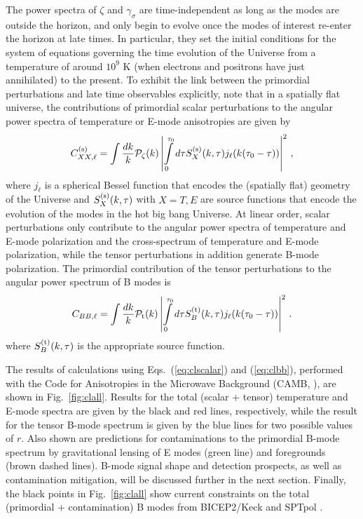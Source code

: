 The power spectra of $\zeta$ and $\gamma_\sigma$ are time-independent as long as the modes are outside the horizon, and only begin to evolve once the modes of interest re-enter the horizon at late times. In particular, they set the initial conditions for the system of equations governing the time evolution of the Universe from a temperature of around $10^9$ K (when electrons and positrons have just annihilated) to the present. To exhibit the link between the primordial perturbations and late time observables explicitly, note that in a spatially flat universe, the contributions of primordial scalar perturbations to the angular power spectra of temperature or E-mode anisotropies are given by
\begin{equation}
C^{({\rm s})}_{XX,\ell}=\int \frac{dk}{k}\mathcal{P}_\zeta(k)\left|\int\limits_0^{\tau_0} d\tau S_X^{({\rm s})}(k,\tau)j_\ell(k(\tau_0-\tau))\right|^2\,,
\label{eq:clscalar}
\end{equation}
where $j_\ell$ is a spherical Bessel function that encodes the (spatially flat) geometry of the Universe and $S_X^{({\rm s})}(k,\tau)$ with $X=T,E$ are source functions that encode the evolution of the modes in the hot big bang Universe.
At linear order, scalar perturbations only contribute to the angular power spectra of temperature and E-mode polarization and the cross-spectrum of temperature and E-mode polarization, while the tensor perturbations in addition generate B-mode polarization. The primordial contribution of the tensor perturbations to the angular power spectrum of B modes is 
\begin{equation}
C_{BB,\ell}=\int \frac{dk}{k}\mathcal{P}_{\rm t}(k)\left|\int\limits_0^{\tau_0} d\tau S_B^{({\rm t})}(k,\tau)j_\ell(k(\tau_0-\tau))\right|^2\,.
\label{eq:clbb}
\end{equation}
where $S_B^{({\rm t})}(k,\tau)$ is the appropriate source function. 

The results of calculations using Eqs.~(\ref{eq:clscalar}) and (\ref{eq:clbb}), performed with the Code for Anisotropies in the Microwave Background (CAMB, \cite{Lewis:1999bs}), are shown in Fig.~\ref{fig:clall}. Results for the total (scalar + tensor) temperature and E-mode spectra are given by the black and red lines, respectively, while the result for the tensor B-mode spectrum is given by the blue lines for two possible values of $r$. Also shown are predictions for contaminations to the primordial B-mode spectrum by gravitational lensing of E modes (green line) and foregrounds (brown dashed lines). B-mode signal shape and detection prospects, as well as contamination mitigation, will be discussed further in the next section.  Finally, the black points in Fig.~\ref{fig:clall} show current constraints on the total (primordial + contamination) B modes from BICEP2/Keck \cite{Ade:2015fwj} and SPTpol \cite{Keisler:2015hfa}.

